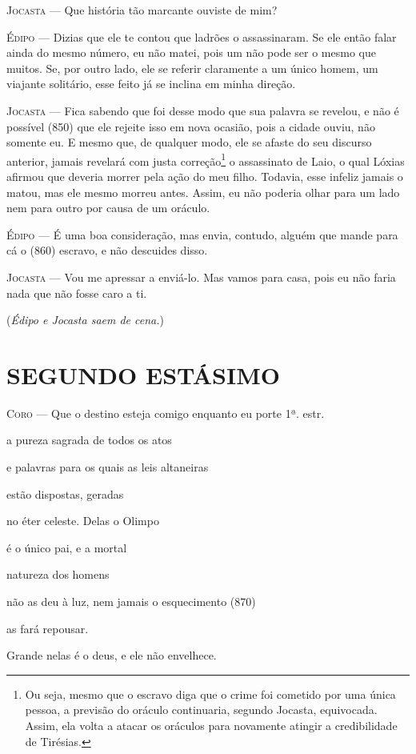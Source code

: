 \textsc{Jocasta} --- Que história tão marcante ouviste de mim?

\textsc{Édipo} --- Dizias que ele te contou que ladrões o assassinaram. Se ele então falar
ainda do mesmo número, eu não matei, pois um não pode ser o mesmo que
muitos. Se, por outro lado, ele se referir claramente a um único homem,
um viajante solitário, esse feito já se inclina em minha direção.

\textsc{Jocasta} --- Fica sabendo que foi desse modo que sua palavra se revelou, e não é
possível (850) que ele rejeite isso em nova ocasião, pois a cidade
ouviu, não somente eu. E mesmo que, de qualquer modo, ele se afaste do
seu discurso anterior, jamais revelará com justa correção\footnote{Ou
  seja, mesmo que o escravo diga que o crime foi cometido por uma única
  pessoa, a previsão do oráculo continuaria, segundo Jocasta,
  equivocada. Assim, ela volta a atacar os oráculos para novamente
  atingir a credibilidade de Tirésias.} o assassinato de Laio, o qual
Lóxias afirmou que deveria morrer pela ação do meu filho. Todavia, esse
infeliz jamais o matou, mas ele mesmo morreu antes. Assim, eu não
poderia olhar para um lado nem para outro por causa de um oráculo.

\textsc{Édipo} --- É uma boa consideração, mas envia, contudo, alguém que mande para cá o
(860) escravo, e não descuides disso.

\textsc{Jocasta} --- Vou me apressar a enviá-lo. Mas vamos para casa, pois eu não faria nada
que não fosse caro a ti.

(\emph{Édipo e Jocasta saem de cena.})

\section{SEGUNDO ESTÁSIMO}

\textsc{Coro} --- Que o destino esteja comigo enquanto eu porte 1ª. estr.

a pureza sagrada de todos os atos

e palavras para os quais as leis altaneiras

estão dispostas, geradas

no éter celeste. Delas o Olimpo

é o único pai, e a mortal

natureza dos homens

não as deu à luz, nem jamais o esquecimento (870)

as fará repousar.

Grande nelas é o deus, e ele não envelhece.


